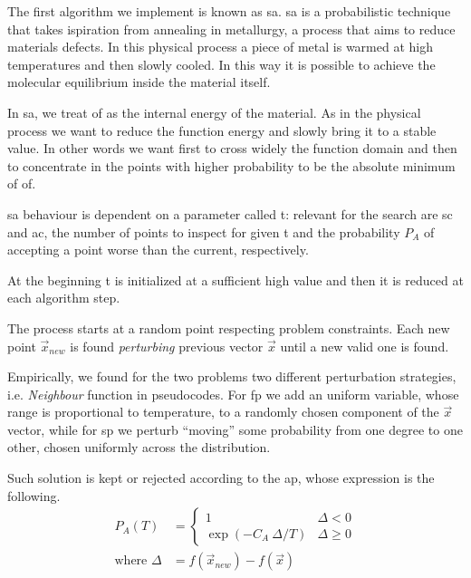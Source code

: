 \documentclass[12pt,journal,draftclsnofoot,onecolumn]{IEEEtran}
\begin{document}
The first algorithm we implement is known as \gls{sa}.
\gls{sa} is a probabilistic technique that takes ispiration from annealing in metallurgy, a process that aims to reduce materials defects.
In this physical process a piece of metal is warmed at high temperatures and then slowly cooled. In this way it is possible to achieve the molecular equilibrium inside the material itself.

In \gls{sa}, we treat \gls{of} as the internal energy of the material.
As in the physical process we want to reduce the function energy and slowly bring it to a stable value. In other words we want first to cross widely the function domain and then to concentrate in the points with higher probability to be the absolute minimum of \gls{of}.

\gls{sa} behaviour is dependent on a parameter called \gls{t}: relevant for the search are \gls{sc} and \gls{ac}, the number of points to inspect for given \gls{t} and the probability $P_A$ of accepting a point worse than the current, respectively.

At the beginning \gls{t} is initialized at a sufficient high value and then it is reduced at each algorithm step.

The process starts at a random point respecting problem constraints. Each new point $\vec{x}_{new}$ is found \emph{perturbing} previous vector $\vec{x}$ until a new valid one is found.

Empirically, we found for the two problems two different perturbation strategies, i.e. \emph{Neighbour} function in pseudocodes.
For \gls{fp} we add an uniform variable, whose range is proportional to temperature, to a randomly chosen component of the $\vec{x}$ vector, while for \gls{sp} we perturb ``moving'' some probability from one degree to one other, chosen uniformly across the distribution.


Such solution is kept or rejected according to the \gls{ap}, whose expression is the following.
\begin{equation*} \label{accept_prob}
	\begin{split}
	P_A(T) &= \begin{cases}
		1 & \Delta < 0 \\
		\exp{ \left( - C_A ~ \Delta / T \right) }
		& \Delta \geq 0
	\end{cases} \\
	\text{where } \Delta &= f(\vec{x}_{new})-f (\vec{x})
	\end{split}
\end{equation*}
\end{document}
